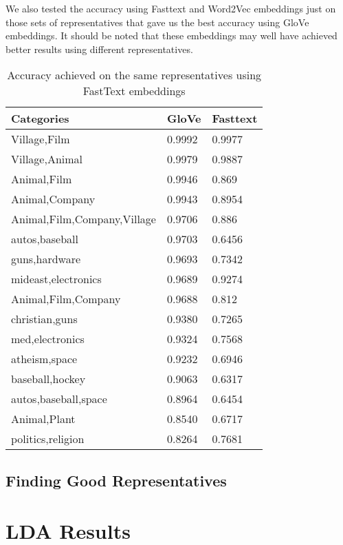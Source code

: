 We also tested the accuracy using Fasttext and Word2Vec embeddings just on those sets of representatives that gave us the best accuracy using GloVe embeddings. It should be noted that these embeddings may well have achieved better results using different representatives.

\begin{table}[]
\centering
\caption{Accuracy achieved on the same representatives using FastText embeddings}
\label{my-label-2}
\begin{tabular}{lll}
\toprule
Categories                  & GloVe & Fasttext \\
\midrule
Village,Film                & 0.9992        & 0.9977       \\
Village,Animal              & 0.9979        & 0.9887       \\
Animal,Film                 & 0.9946        & 0.869       \\
Animal,Company              & 0.9943        & 0.8954       \\
Animal,Film,Company,Village & 0.9706        & 0.886       \\
autos,baseball              & 0.9703        & 0.6456       \\
guns,hardware               & 0.9693        & 0.7342       \\
mideast,electronics         & 0.9689        & 0.9274       \\
Animal,Film,Company         & 0.9688        & 0.812       \\
christian,guns              & 0.9380        & 0.7265       \\
med,electronics             & 0.9324        & 0.7568       \\
atheism,space               & 0.9232        & 0.6946       \\
baseball,hockey             & 0.9063        & 0.6317       \\
autos,baseball,space        & 0.8964        & 0.6454      \\
Animal,Plant                 & 0.8540        & 0.6717       \\
politics,religion           & 0.8264        & 0.7681     
\end{tabular}
\end{table}

\subsection{Finding Good Representatives}



\section{LDA Results}

 